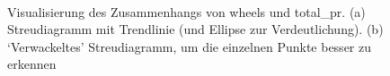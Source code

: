 \documentclass[
  letterpaper,
  twoside,
  open=any]{scrbook}
\theoremstyle{definition}
\theoremstyle{definition}
\theoremstyle{definition}
\theoremstyle{remark}
\begin{document}
\begin{figure}

\begin{minipage}{0.45\linewidth}



\end{minipage}%
%
\begin{minipage}{0.10\linewidth}
~\end{minipage}%
%
\begin{minipage}{0.45\linewidth}



\end{minipage}%

\caption{\label{fig-zshg}Visualisierung des Zusammenhangs von wheels und
total\_pr. (a) Streudiagramm mit Trendlinie (und Ellipse zur
Verdeutlichung). (b) \enquote*{Verwackeltes} Streudiagramm, um die
einzelnen Punkte besser zu erkennen}

\end{figure}%
\end{document}

